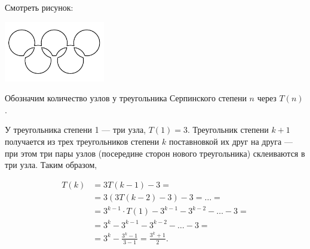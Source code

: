 ﻿

\begin{itemize}
\itA Смотреть рисунок:
\vfill\eject

\begin{multicols}{2}

\begin{center}
	\includegraphics[width=4.4cm]{figures/2018-serpinsky-a}
\end{center}

\columnbreak

\begin{center}  \end{center}

\end{multicols}


\itB Обозначим количество узлов у треугольника Серпинского степени $n$ через $T(n)$.

У треугольника степени 1 — три узла, $T(1)=3$. Треугольник степени $k+1$ получается из  трех треугольников степени $k$ поставновкой их друг на друга — при этом три пары узлов (посередине сторон нового треугольника) склеиваются в три узла. Таким образом,

\begin{align*}
	T(k) & = 3T(k-1) - 3 =\\
	& = 3(3T(k-2)-3)-3 = \ldots = \\
	& = 3^{k-1}\cdot T(1) - 3^{k-1} - 3^{k-2} - \ldots - 3 = \\
	& = 3^k - 3^{k-1} - 3^{k-2} - \ldots - 3 = \\
	& = 3^k - \frac{3^k-1}{3-1} = \frac{3^k+1}{2}. \\
\end{align*}


\end{itemize}

